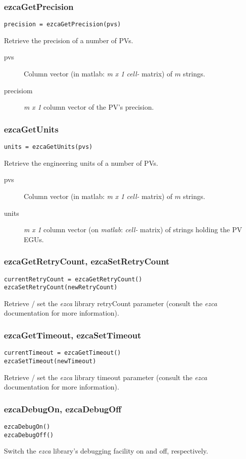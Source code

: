 \documentclass{article}
\newcommand{\matlab}{\ita{matlab}}
\newcommand{\ezca}{\ita{ezca}}
\newcommand{\ita}[1]{\emph{#1}}
\newcommand{\m}{$m$}
\newcommand{\mhack}{$m$} %
\newcommand{\mxl}{$m\times 1$}
\renewcommand{\m}{\ita{m}}
\newcommand{\mhack}{\ita{m}} %
\renewcommand{\mxl}{\ita{m x 1}}
\newcommand{\PVITEM}{
\item[pvs] Column vector (in matlab: \mxl{} \ita{cell-} matrix)
of \mhack{} strings.
}
\begin{document}
\subsubsection{ezcaGetPrecision}
\begin{verbatim}
precision = ezcaGetPrecision(pvs)
\end{verbatim}
Retrieve the precision of a number of PVs.
\begin{description}
\PVITEM
\item[precisiom] \mxl{} column vector of the PV's precision.
\end{description}

\subsubsection{ezcaGetUnits}
\begin{verbatim}
units = ezcaGetUnits(pvs)
\end{verbatim}
Retrieve the engineering units of a number of PVs.
\begin{description}
\PVITEM
\item[units] \mxl{} column vector (on \matlab: \ita{cell-} matrix)
of strings holding the PV EGUs.
\end{description}

\subsubsection{ezcaGetRetryCount, ezcaSetRetryCount}
\begin{verbatim}
currentRetryCount = ezcaGetRetryCount()
ezcaSetRetryCount(newRetryCount)
\end{verbatim}
Retrieve / set the \ezca{} library retryCount parameter (consult the \ezca{}
documentation for more information).


\subsubsection{ezcaGetTimeout, ezcaSetTimeout}
\begin{verbatim}
currentTimeout = ezcaGetTimeout()
ezcaSetTimeout(newTimeout)
\end{verbatim}
Retrieve / set the \ezca{} library timeout parameter (consult the \ezca{}
documentation for more information).

\subsubsection{ezcaDebugOn, ezcaDebugOff}
\begin{verbatim}
ezcaDebugOn()
ezcaDebugOff()
\end{verbatim}
Switch the \ezca{} library's debugging facility on and off, respectively.
\end{document}
